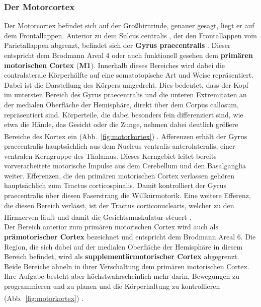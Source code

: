 \documentclass[12pt,a4paper,pdftex]{article}
\begin{document}
\subsubsection*{Der Motorcortex} 
Der Motorcortex befindet sich auf der Großhirnrinde, genauer gesagt, liegt er auf dem Frontallappen. Anterior zu dem Sulcus centralis , der den Frontallappen vom Parietallappen abgrenzt, befindet sich der \textbf{Gyrus praecentralis} . Dieser entspricht dem Brodmann Areal 4 oder auch funktionell gesehen dem \textbf{primären motorischen Cortex}  (\textbf{M1}). Innerhalb dieses Bereiches wird dabei die contralaterale Körperhälfte auf eine somatotopische Art und Weise repräsentiert. Dabei ist die Darstellung des Körpers umgedreht. Dies bedeutet, dass der Kopf im untersten Bereich des Gyrus praecentralis und die unteren Extremitäten an der medialen Oberfläche der Hemisphäre, direkt über dem Corpus callosum, repräsentiert sind. Körperteile, die dabei besonders fein differenziert sind, wie etwa die Hände, das Gesicht oder die Zunge, nehmen dabei deutlich größere Bereiche des Kortex ein (Abb.~\ref{fig:motorkortex}) \textsuperscript{\cite[13]{crossman2014neuroanatomy}}. Afferenzen erhält der Gyrus praecentralis hauptsächlich aus dem Nucleus ventralis anterolateralis, einer ventralen Kerngruppe des Thalamus. Dieses Kerngebiet leitet bereits vorverarbeitete motorische Impulse aus dem Cerebellum und den Basalganglia weiter. Efferenzen, die den primären motorischen Cortex verlassen gehören hauptsächlich zum Tractus corticospinalis. Damit kontrolliert der Gyrus praecentralis über diesen Faserstrang die Willkürmotorik. Eine weitere Efferenz, die diesen Bereich verlässt, ist der Tractus corticonuclearis, welcher zu den Hirnnerven läuft und damit die Gesichtsmuskulatur steuert \textsuperscript{\cite[9]{trepel2011neuroanatomie}}. \\
Der Bereich anterior zum primären motorischen Cortex wird auch als \textbf{prämotorischer Cortex}  bezeichnet und entspricht dem Brodmann Areal 6. Die Region, die sich dabei auf der medialen Oberfläche der Hemisphäre in diesem Bereich befindet, wird als \textbf{supplementärmotorischer Cortex}  abgegrenzt. Beide Bereiche ähneln in ihrer Verschaltung dem primären motorischen Cortex. Ihre Aufgabe besteht aber höchstwahrscheinlich mehr darin, Bewegungen zu programmieren und zu planen und die Körperhaltung zu kontrollieren (Abb.~\ref{fig:motorkortex}) \textsuperscript{\cite[13]{crossman2014neuroanatomy}}. 
\end{document}
